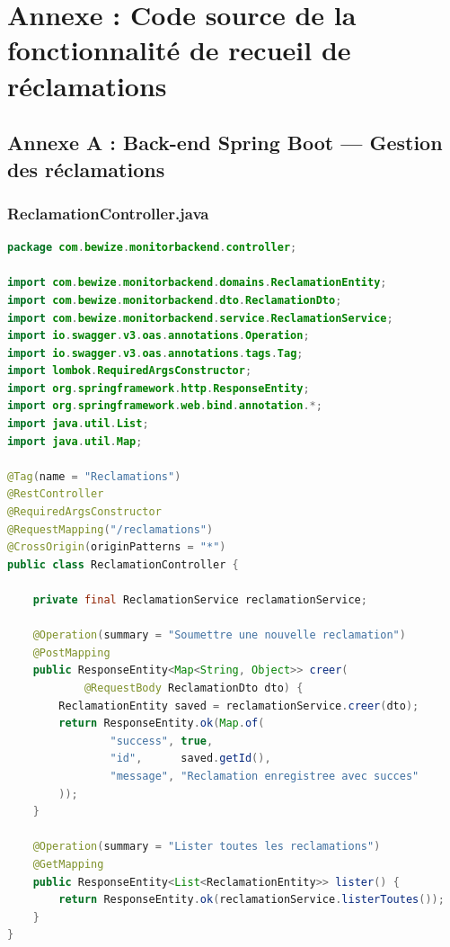 \chapter*{Annexe : Code source de la fonctionnalité de recueil de réclamations}

\section*{Annexe A : Back-end Spring Boot — Gestion des réclamations}

\subsection*{ReclamationController.java}
\begin{lstlisting}[language=Java]
package com.bewize.monitorbackend.controller;

import com.bewize.monitorbackend.domains.ReclamationEntity;
import com.bewize.monitorbackend.dto.ReclamationDto;
import com.bewize.monitorbackend.service.ReclamationService;
import io.swagger.v3.oas.annotations.Operation;
import io.swagger.v3.oas.annotations.tags.Tag;
import lombok.RequiredArgsConstructor;
import org.springframework.http.ResponseEntity;
import org.springframework.web.bind.annotation.*;
import java.util.List;
import java.util.Map;

@Tag(name = "Reclamations")
@RestController
@RequiredArgsConstructor
@RequestMapping("/reclamations")
@CrossOrigin(originPatterns = "*")
public class ReclamationController {

    private final ReclamationService reclamationService;

    @Operation(summary = "Soumettre une nouvelle reclamation")
    @PostMapping
    public ResponseEntity<Map<String, Object>> creer(
            @RequestBody ReclamationDto dto) {
        ReclamationEntity saved = reclamationService.creer(dto);
        return ResponseEntity.ok(Map.of(
                "success", true,
                "id",      saved.getId(),
                "message", "Reclamation enregistree avec succes"
        ));
    }

    @Operation(summary = "Lister toutes les reclamations")
    @GetMapping
    public ResponseEntity<List<ReclamationEntity>> lister() {
        return ResponseEntity.ok(reclamationService.listerToutes());
    }
}
\end{lstlisting}

